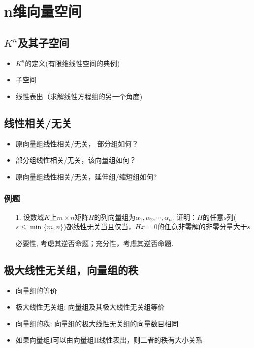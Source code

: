 \chapter{n维向量空间}

\section{$K^n$及其子空间}
\begin{itemize}
    \item $K^n$的定义(有限维线性空间的典例)
	\item 子空间
	\item 线性表出（求解线性方程组的另一个角度)
\end{itemize}

\section{线性相关/无关}
\begin{itemize}
	\item 原向量组线性相关/无关， 部分组如何？
	\item 部分组线性相关/无关，该向量组如何？
	\item 原向量组线性相关/无关，延伸组/缩短组如何?
\end{itemize}

\subsection*{例题}
\begin{itemize}
	\item[1.] 设数域$K$上$m\times n$矩阵$H$的列向量组为$\alpha_1, \alpha_2, \cdots, \alpha_n$.
	证明：$H$的任意$s$列($s\le \min\{m,n\}$)都线性无关当且仅当，$Hx=0$的任意非零解的非零分量大于$s$
	\begin{solution}
		必要性, 考虑其逆否命题；充分性，考虑其逆否命题.
	\end{solution}
	\vspace{2cm}
\end{itemize}

\section{极大线性无关组，向量组的秩}
\begin{itemize}
	\item 向量组的等价
	\item 极大线性无关组: 向量组及其极大线性无关组等价
	\item 向量组的秩: 向量组的极大线性无关组的向量数目相同
	\item 如果向量组I可以由向量组II线性表出，则二者的秩有大小关系
\end{itemize}

